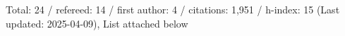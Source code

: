 Total: 24 / refereed: 14 / first author: 4 / citations: 1,951 / h-index: 15 (Last updated: 2025-04-09), List attached below